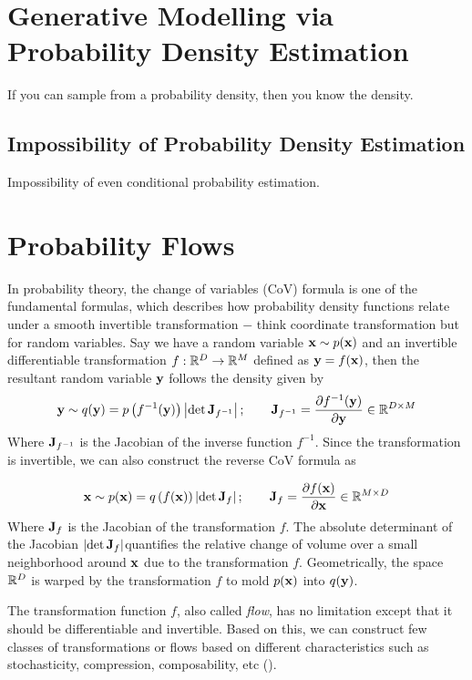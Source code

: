 \documentclass[a4paper, 11pt]{article}
\begin{document}
\section{Generative Modelling via Probability Density Estimation}

If you can sample from a probability density, then you know the density.

\subsection{Impossibility of Probability Density Estimation}
Impossibility of even conditional probability estimation.

\section{Probability Flows}
In probability theory, the change of variables (CoV) formula is one of the fundamental formulas, which describes how probability density functions relate under a smooth invertible transformation $-$ think coordinate transformation but for random variables. Say we have a random variable $\mbox{$\mbox{$\mathbf{x}$}$} \sim p(\mbox{$\mbox{$\mathbf{x}$}$})$ and an invertible differentiable transformation $f: \mathbb{R}^D \to \mathbb{R}^M$ defined as $\mbox{$\mbox{$\mathbf{y}$}$} = f(\mbox{$\mbox{$\mathbf{x}$}$})$, then the resultant random variable $\mbox{$\mbox{$\mathbf{y}$}$}$ follows the density given by
\begin{align}
    \mbox{$\mbox{$\mathbf{y}$}$} \sim q(\mbox{$\mbox{$\mathbf{y}$}$}) = p\left(f^{-1}(\mbox{$\mbox{$\mathbf{y}$}$}) \right)\left |\det \mbox{$\mbox{$\mathbf{J}$}$}_{f^{-1}} \right|; \qquad \mbox{$\mbox{$\mathbf{J}$}$}_{f^{-1}} = \frac{\partial f^{-1}(\mbox{$\mbox{$\mathbf{y}$}$})}{\partial \mbox{$\mbox{$\mathbf{y}$}$}} \in \mathbb{R}^{D \times M}
\end{align}
Where $\mbox{$\mbox{$\mathbf{J}$}$}_{f^{-1}}$ is the Jacobian of the inverse function $f^{-1}$. Since the transformation is invertible, we can also construct the reverse CoV formula as

\begin{align}
    \mbox{$\mbox{$\mathbf{x}$}$} \sim p(\mbox{$\mbox{$\mathbf{x}$}$}) = q\left(f(\mbox{$\mbox{$\mathbf{x}$}$}) \right)\left |\det \mbox{$\mbox{$\mathbf{J}$}$}_{f} \right|; \qquad \mbox{$\mbox{$\mathbf{J}$}$}_{f} = \frac{\partial f(\mbox{$\mbox{$\mathbf{x}$}$})}{\partial \mbox{$\mbox{$\mathbf{x}$}$}} \in \mathbb{R}^{M \times D}
\end{align}
Where $\mbox{$\mbox{$\mathbf{J}$}$}_{f}$ is the Jacobian of the transformation $f$. The absolute determinant of the Jacobian $\left |\det \mbox{$\mbox{$\mathbf{J}$}$}_{f} \right|$quantifies the relative change of volume over a small neighborhood around $\mbox{$\mbox{$\mathbf{x}$}$}$ due to the transformation $f$. Geometrically, the space $\mathbb{R}^D$ is warped by the transformation $f$ to mold $p(\mbox{$\mbox{$\mathbf{x}$}$})$ into $q(\mbox{$\mbox{$\mathbf{y}$}$})$.

The transformation function $f$, also called \emph{flow}, has no limitation except that it should be differentiable and invertible. Based on this, we can construct few classes of transformations or flows based on different characteristics such as stochasticity, compression, composability, etc (\cite{kothe2023review}).
\end{document}
